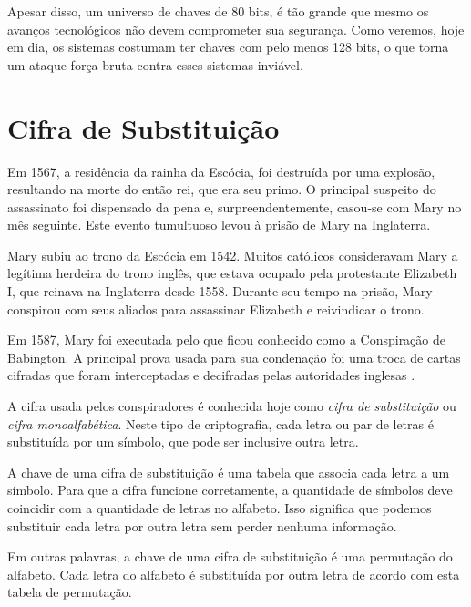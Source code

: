 Apesar disso, um universo de chaves de 80 bits, é tão grande que mesmo os avanços tecnológicos não devem comprometer sua segurança.
Como veremos, hoje em dia, os sistemas costumam ter chaves com pelo menos 128 bits, o que torna um ataque força bruta contra esses sistemas inviável. 

\section{Cifra de Substituição}
\label{sec:cifra-monoalfabetica}

Em 1567, a residência da rainha da Escócia, foi destruída por uma explosão, resultando na morte do então rei, que era seu primo.
O principal suspeito do assassinato foi dispensado da pena e, surpreendentemente, casou-se com Mary no mês seguinte.
Este evento tumultuoso levou à prisão de Mary na Inglaterra.

Mary subiu ao trono da Escócia em 1542.
Muitos católicos consideravam Mary a legítima herdeira do trono inglês, que estava ocupado pela protestante Elizabeth I, que reinava na Inglaterra desde 1558.
Durante seu tempo na prisão, Mary conspirou com seus aliados para assassinar Elizabeth e reivindicar o trono.


Em 1587, Mary foi executada pelo que ficou conhecido como a Conspiração de Babington.
A principal prova usada para sua condenação foi uma troca de cartas cifradas que foram interceptadas e decifradas pelas autoridades inglesas \cite{Singh04}.

A cifra usada pelos conspiradores é conhecida hoje como {\em cifra de substituição} ou {\em cifra monoalfabética}.
Neste tipo de criptografia, cada letra ou par de letras é substituída por um símbolo, que pode ser inclusive outra letra.

A chave de uma cifra de substituição é uma tabela que associa cada letra a um símbolo.
Para que a cifra funcione corretamente, a quantidade de símbolos deve coincidir com a quantidade de letras no alfabeto.
Isso significa que podemos substituir cada letra por outra letra sem perder nenhuma informação.

Em outras palavras, a chave de uma cifra de substituição é uma permutação do alfabeto.
Cada letra do alfabeto é substituída por outra letra de acordo com esta tabela de permutação.

